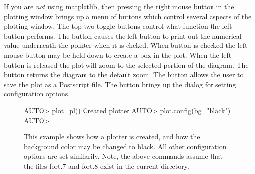 \documentclass[12pt]{report}
\begin{document}
 If you are \emph{not} using matplotlib, then
 pressing the right mouse button in the plotting window brings
 up a menu of buttons which control several aspects
 of the plotting window.  The top two toggle buttons
 control what function the left button performs.  
 The  button causes the
 left button to print out the numerical value underneath
 the pointer when it is clicked.
 When  button is checked the left
 mouse button may be held down to create
 a box in the plot.  When the left button
 is released the plot will zoom to the selected
 portion of the diagram.
 The  button returns the
 diagram to the default zoom. 
 The  button allows the user
 to save the plot as a Postscript file.
 The  button brings up
 the dialog for setting configuration options.

 \begin{figure}[htbp]
 {\small \begin{center} \begin{boxedverbatim} 
 AUTO> plot=pl()
 Created plotter
 AUTO> plot.config(bg="black")
 AUTO> 
 \end{boxedverbatim}
 \end{center} 
 }
 \caption[Configuring a two-dimensional plotter.]
 {This example shows how a plotter is created, and
 how the background color may be changed to black.
 All other configuration options are set similarily.
 Note, the above commands assume that the files
 fort.7 and fort.8 exist in the current directory.
 }
 \label{exa:plotter_example}
 \end{figure}
\end{document}
